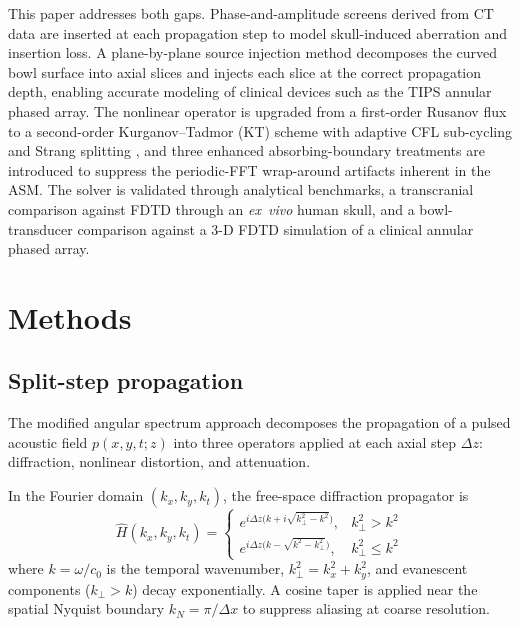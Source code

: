 \documentclass[11pt]{article}
\begin{document}
This paper addresses both gaps.  Phase-and-amplitude screens derived
from CT data are inserted at each propagation step to model
skull-induced aberration and insertion loss.  A plane-by-plane source
injection method decomposes the curved bowl surface into axial slices
and injects each slice at the correct propagation depth, enabling
accurate modeling of clinical devices such as the TIPS annular phased
array.  The nonlinear operator is upgraded from a first-order Rusanov
flux to a second-order Kurganov--Tadmor (KT) scheme \cite{kurganov2000}
with adaptive CFL sub-cycling and Strang splitting \cite{strang1968},
and three enhanced absorbing-boundary treatments are introduced
to suppress the periodic-FFT wrap-around artifacts inherent in the ASM.
The solver is validated through analytical benchmarks, a transcranial
comparison against FDTD through an \emph{ex~vivo} human skull, and a
bowl-transducer comparison against a 3-D FDTD simulation of a
clinical annular phased array.

\section{Methods}
\label{sec:methods}

\subsection{Split-step propagation}

The modified angular spectrum approach decomposes the propagation of a
pulsed acoustic field $p(x,y,t;z)$ into three operators applied at
each axial step $\Delta z$: diffraction, nonlinear distortion, and
attenuation.

In the Fourier domain $(k_x, k_y, k_t)$, the free-space diffraction
propagator is
\begin{equation}
  \hat{H}(k_x, k_y, k_t) =
  \begin{cases}
    e^{i\Delta z\bigl(k + i\sqrt{k_\perp^2 - k^2}\bigr)}, & k_\perp^2 > k^2 \\[4pt]
    e^{i\Delta z\bigl(k - \sqrt{k^2 - k_\perp^2}\bigr)},   & k_\perp^2 \le k^2
  \end{cases}
  \label{eq:propagator}
\end{equation}
where $k = \omega/c_0$ is the temporal wavenumber, $k_\perp^2 = k_x^2
+ k_y^2$, and evanescent components ($k_\perp > k$) decay
exponentially.  A cosine taper is applied near the spatial Nyquist
boundary $k_N = \pi/\Delta x$ to suppress aliasing at coarse
resolution.
\end{document}
